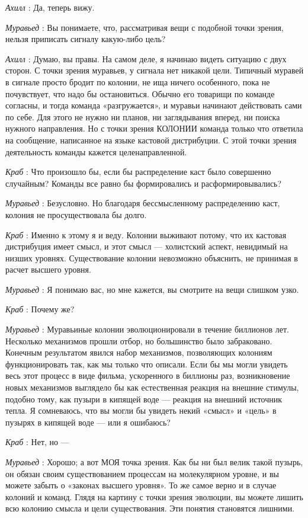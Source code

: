 \documentclass[../main.tex]{subfiles}
\begin{document}
\begin{dialogue}
\emph{Ахилл} : Да, теперь вижу.

\emph{Муравьед} : Вы понимаете, что, рассматривая вещи с подобной точки зрения, нельзя приписать сигналу какую-либо цель?

\emph{Ахилл} : Думаю, вы правы. На самом деле, я начинаю видеть ситуацию с двух сторон. С точки зрения муравьев, у сигнала нет никакой цели. Типичный муравей в сигнале просто бродит по колонии, не ища ничего особенного, пока не почувствует, что надо бы остановиться. Обычно его товарищи по команде согласны, и тогда команда «разгружается», и муравьи начинают действовать сами по себе. Для этого не нужно ни планов, ни заглядывания вперед, ни поиска нужного направления. Но с точки зрения КОЛОНИИ команда только что ответила на сообщение, написанное на языке кастовой дистрибуции. С этой точки зрения деятельность команды кажется целенаправленной.

\emph{Краб} : Что произошло бы, если бы распределение каст было совершенно случайным? Команды все равно бы формировались и расформировывались?

\emph{Муравьед} : Безусловно. Но благодаря бессмысленному распределению каст, колония не просуществовала бы долго.

\emph{Краб} : Именно к этому я и веду. Колонии выживают потому, что их кастовая дистрибуция имеет смысл, и этот смысл --- холистский аспект, невидимый на низших уровнях. Существование колонии невозможно объяснить, не принимая в расчет высшего уровня.

\emph{Муравьед} : Я понимаю вас, но мне кажется, вы смотрите на вещи слишком узко.

\emph{Краб} : Почему же?

\emph{Муравьед} : Муравьиные колонии эволюционировали в течение биллионов лет. Несколько механизмов прошли отбор, но большинство было забраковано. Конечным результатом явился набор механизмов, позволяющих колониям функционировать так, как мы только что описали. Если бы мы могли увидеть весь этот процесс в виде фильма, ускоренного в биллионы раз, возникновение новых механизмов выглядело бы как естественная реакция на внешние стимулы, подобно тому, как пузыри в кипящей воде --- реакция на внешний источник тепла. Я сомневаюсь, что вы могли бы увидеть некий «смысл» и «цель» в пузырях в кипящей воде --- или я ошибаюсь?

\emph{Краб} : Нет, но ---

\emph{Муравьед} : Хорошо; а вот МОЯ точка зрения. Как бы ни был велик такой пузырь, он обязан своим существованием процессам на молекулярном уровне, и вы можете забыть о «законах высшего уровня». То же самое верно и в случае колоний и команд. Глядя на картину с точки зрения эволюции, вы можете лишить всю колонию смысла и цели существования. Эти понятия становятся лишними.


\end{dialogue}
\end{document}
